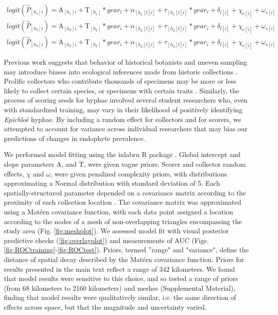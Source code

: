 \documentclass[11pt]{article}
\let\cite\citep
\newcommand{\tom}[2]{{\color{red}{#1}}\footnote{\textit{\color{red}{#2}}}}
\begin{document}
\begin{subequations}
	\label{eq:trends}
	\begin{align}
		logit(\hat{P}_{[h_{1}]i}) =  \mathrm{A}_{[h_{1}]i} + \mathrm{T}_{[h_{1}]}*year_i  + \alpha_{[h_{1}]l[i]} + \tau_{[h_{1}]l[i]}*year_i  + \delta_{l[i]}+ \chi_{c[i]} + \omega_{s[i]} \\
		logit(\hat{P}_{[h_{2}]i}) = \mathrm{A}_{[h_{2}]i} + \mathrm{T}_{[h_{2}]}*year_i  + \alpha_{[h_{2}]l[i]} + \tau_{[h_{2}]l[i]}*year_i  + \delta_{l[i]}+ \chi_{c[i]} + \omega_{s[i]} \\
		logit(\hat{P}_{[h_{3}]i}) = \mathrm{A}_{[h_{2}]i} + \mathrm{T}_{[h_{2}]}*year_i  + \alpha_{[h_{2}]l[i]} + \tau_{[h_{3}]l[i]}*year_i  + \delta_{l[i]}+ \chi_{c[i]} + \omega_{s[i]}
	\end{align}
\end{subequations}


Previous work suggests that behavior of historical botanists and uneven sampling may introduce biases into ecological inferences made from historic collections \cite{kozlov2020biases}. 
Prolific collectors who contribute thousands of specimens may be more or less likely to collect certain species, or specimens with certain traits \cite{daru2018widespread}. 
Similarly, the process of scoring seeds for hyphae involved several student researchers who, even with standardized training, may vary in their likelihood of positively identifying \emph{Epichloë} hyphae. 
By including a random effect for collectors and for scorers, we attempted to account for variance across individual researchers that may bias our predictions of changes in endophyte prevalence.


We performed model fitting using the inlabru R package \citep{bachl2019inlabru}.
Global intercept and slope parameters $\mathrm{A}$, and $\mathrm{T}$, were given vague priors.
Scorer and collector random effects, $\chi$ and $\omega$, were given penalized complexity priors, with distributions approximating a Normal distribution with standard deviation of 5. 
Each spatially-structured parameter depended on a covariance matrix according to the proximity of each collection location \citep{lindgren2011explicit,bakka2018spatial}. 
The covariance matrix was approximated using a Mat\'{e}rn covariance function, with each data point assigned a location according to the nodes of a mesh of non-overlapping triangles encompassing the study area (Fig. \ref{fig:meshplot}).
We assessed model fit with visual posterior predictive checks (\ref{fig:overlayplot}) and measurements of AUC (Figs. \ref{fig:ROCtraining}-\ref{fig:ROCtest}).
Priors, termed ''range" and "variance", define the distance of spatial decay described by the Mat\'{e}rn covariance function.
Priors for results presented in the main text reflect a range of $342$ kilometers. 
We found that model results were sensitive to this choice, and so tested a range of priors (from 68 kilometers to 2160 kilometers) and meshes (Supplemental Material), finding that model results were qualitatively similar, i.e. the same direction of effects across space, but that the magnitude and uncertainty varied. 
\end{document}
